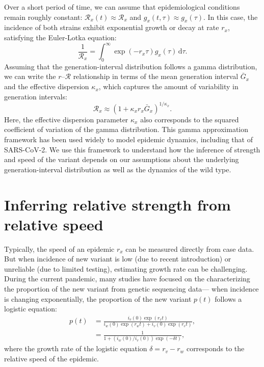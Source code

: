 \documentclass[12pt]{article}
\newcommand{\RR}{\ensuremath{{\mathcal R}}\xspace}
\newcommand{\dd}[1]{\ensuremath{\, \mathrm{d}#1}}
\newcommand{\dtau}{\dd{\tau}}
\begin{document}
Over a short period of time, we can assume that epidemiological conditions remain roughly constant: $\RR_x(t) \approx \RR_x$ and $g_x(t, \tau) \approx g_x(\tau)$.
In this case, the incidence of both strains exhibit exponential growth or decay at rate $r_x$, satisfying the Euler-Lotka equation:
\begin{equation}
\frac{1}{\RR_x} = \int_0^\infty \exp(- r_x \tau) g_x(\tau) \dtau.
\end{equation}
Assuming that the generation-interval distribution follows a gamma distribution, we can write the $r$--$\RR$ relationship in terms of the mean generation interval $\bar{G}_x$ and the effective dispersion $\kappa_x$, which captures the amount of variability in generation intervals:
\begin{equation}
\RR_x \approx (1 + \kappa_x r_x \bar{G}_x)^{1/\kappa_x}.
\end{equation}
Here, the effective dispersion parameter $\kappa_x$ also corresponds to the squared coefficient of variation of the gamma distribution.
This gamma approximation framework has been used widely to model epidemic dynamics, including that of SARS-CoV-2.
We use this framework to understand how the inference of strength and speed of the variant depends on our assumptions about the underlying generation-interval distribution as well as the dynamics of the wild type.

\section{Inferring relative strength from relative speed}

Typically, the speed of an epidemic $r_x$ can be measured directly from case data.
But when incidence of new variant is low (due to recent introduction) or unreliable (due to limited testing), estimating growth rate can be challenging.
During the current pandemic, many studies have focused on the characterizing the proportion of the new variant from genetic sequencing data---
when incidence is changing exponentially, the proportion of the new variant $p(t)$ follows a logistic equation:
\begin{align}
p(t) &= \frac{i_v(0) \exp(r_v t)}{i_w(0) \exp(r_w t) + i_v(0) \exp(r_v t)},\\
&= \frac{1}{1 + \left(i_w(0)/i_v(0)\right) \exp(-\delta t)},
\end{align}
where the growth rate of the logistic equation $\delta = r_v - r_w$ corresponds to the relative speed of the epidemic.
\end{document}
